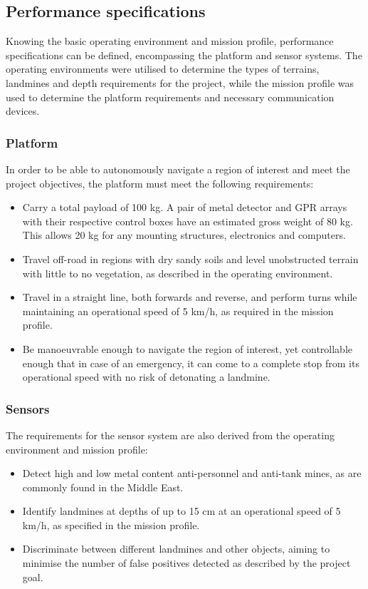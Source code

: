 \documentclass[main.tex]{subfiles}
\begin{document}
\subsection{Performance specifications}
Knowing the basic operating environment and mission profile, performance specifications can be defined, encompassing the platform and sensor systems. The operating environments were utilised to determine the types of terrains, landmines and depth requirements for the project, while the mission profile was used to determine the platform requirements and necessary communication devices.   

\subsubsection{Platform}
In order to be able to autonomously navigate a region of interest and meet the project objectives, the platform must meet the following requirements: 
\begin{itemize}
 \item Carry a total payload of 100 kg. A pair of metal detector and GPR arrays with their respective control boxes have an estimated gross weight of 80 kg. This allows 20 kg for any mounting structures, electronics and computers.
 \item Travel off-road in regions with dry sandy soils and level unobstructed terrain with little to no vegetation, as described in the operating environment.
\item Travel in a straight line, both forwards and reverse, and perform turns while maintaining an operational speed of 5 km/h, as required in the mission profile. 
\item Be manoeuvrable enough to navigate the region of interest, yet controllable enough that in case of an emergency, it can come to a complete stop from its operational speed with no risk of detonating a landmine.
\end{itemize}

\subsubsection{Sensors}
The requirements for the sensor system are also derived from the operating environment and mission profile:
\begin{itemize}
\item Detect high and low metal content anti-personnel and anti-tank mines, as are commonly found in the Middle East. 
\item Identify landmines at depths of up to 15 cm at an operational speed of 5 km/h, as specified in the mission profile.
\item Discriminate between different landmines and other objects, aiming to minimise the number of false positives detected as described by the project goal.
\end{itemize}
\end{document}
